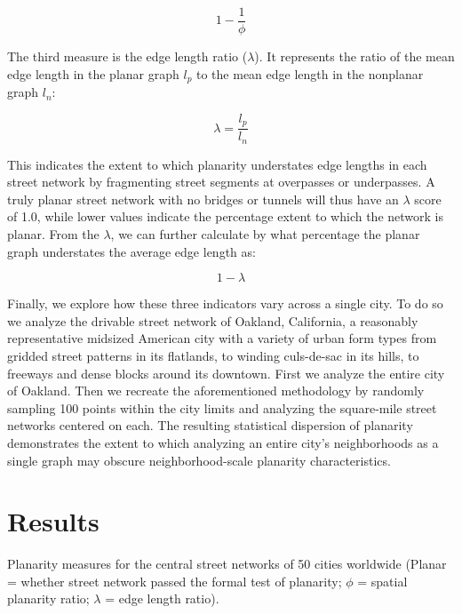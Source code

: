 \documentclass[Afour,sageh,times]{sagej}
\begin{document}
\begin{equation}
	\label{eq:spr_overstates}
	1 - \frac{1}{\phi}
\end{equation}

The third measure is the edge length ratio ($\lambda$). It represents the ratio of the mean edge length in the planar graph $l_p$ to the mean edge length in the nonplanar graph $l_n$:

\begin{equation}
	\label{eq:elr}
	\lambda = \frac{l_p}{l_n}
\end{equation}

This indicates the extent to which planarity understates edge lengths in each street network by fragmenting street segments at overpasses or underpasses. A truly planar street network with no bridges or tunnels will thus have an $\lambda$ score of 1.0, while lower values indicate the percentage extent to which the network is planar. From the $\lambda$, we can further calculate by what percentage the planar graph understates the average edge length as:

\begin{equation}
	\label{eq:elr_understates}
	1 - \lambda
\end{equation}

Finally, we explore how these three indicators vary across a single city. To do so we analyze the drivable street network of Oakland, California, a reasonably representative midsized American city with a variety of urban form types from gridded street patterns in its flatlands, to winding culs-de-sac in its hills, to freeways and dense blocks around its downtown. First we analyze the entire city of Oakland. Then we recreate the aforementioned methodology by randomly sampling 100 points within the city limits and analyzing the square-mile street networks centered on each. The resulting statistical dispersion of planarity demonstrates the extent to which analyzing an entire city's neighborhoods as a single graph may obscure neighborhood-scale planarity characteristics.



\section{Results}

\begin{table}[htbp]
	\centering
	\caption{Planarity measures for the central street networks of 50 cities worldwide (Planar = whether street network passed the formal test of planarity; $\phi$ = spatial planarity ratio; $\lambda$ = edge length ratio).}
	\label{tab:world_cities}
	
\end{table}
\end{document}
